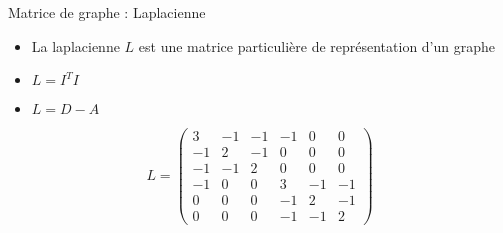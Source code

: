 \begin{frame}{Matrice de graphe : Laplacienne}
    \begin{minipage}{0.49\linewidth}
        \begin{itemize}
            \item La \alert{laplacienne} $L$ est une matrice particulière de représentation d'un graphe
            \item $L = I^{T}I$
            \item $L = D - A$
        \end{itemize}
        \footnotesize{$$
            L = \begin{pmatrix}
                3 & -1 & -1 & -1 & 0 & 0\\
                -1 & 2 & -1 & 0 & 0 & 0\\
                -1 & -1 & 2 & 0 & 0 & 0\\
                -1 & 0 & 0 & 3 & -1 & -1\\
                0 & 0 & 0 & -1 & 2 & -1\\
                0 & 0 & 0 & -1 & -1 & 2
            \end{pmatrix}
        $$}
    \end{minipage}
    \begin{minipage}{0.49\linewidth}
    \end{minipage}
\end{frame}

